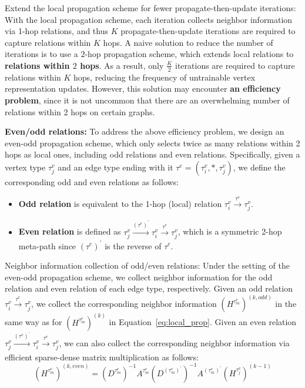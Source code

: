 \documentclass[lettersize,journal]{IEEEtran}
\begin{document}
Extend the local propagation scheme for fewer propagate-then-update iterations:
With the local propagation scheme, each iteration collects neighbor information via 1-hop relations, and thus $K$ propagate-then-update iterations are required to capture relations within $K$ hops.
A naive solution to reduce the number of iterations is to use a $2$-hop propagation scheme, which extends local relations to \textbf{relations within $2$ hops}.
As a result, only $\frac{K}{2}$ iterations are required to capture relations within $K$ hops, reducing the frequency of untrainable vertex representation updates.
However, this solution may encounter \textbf{an efficiency problem}, since it is not uncommon that there are an overwhelming number of relations within 2 hops on certain graphs.




\textbf{Even/odd relations:}
To address the above efficiency problem, we design an even-odd propagation scheme, which only selects twice as many relations within 2 hops as local ones, including odd relations and even relations.
Specifically, given a vertex type  $\tau^{v}_j$ and an edge type ending with it $\tau^{e} = (\tau^{v}_i, *, \tau^{v}_j)$, we define the corresponding odd and even relations as follows:
\begin{itemize}
\item \textbf{Odd relation} is equivalent to the 1-hop (local) relation $\tau^{v}_{i} \xrightarrow[]{\tau^{e}} \tau^{v}_{j}$.
\item \textbf{Even relation} is defined as $\tau^{v}_{j} \xrightarrow[]{(\tau^{e})^{\prime}} \tau^{v}_{i} \xrightarrow[]{\tau^{e}} \tau^{v}_{j}$, which is a symmetric 2-hop meta-path since $(\tau^{e})^{\prime}$ is the reverse of $\tau^{e}$.
\end{itemize}










Neighbor information collection of odd/even relations:
Under the setting of the even-odd propagation scheme, we collect neighbor information for the odd relation and even relation of each edge type, respectively.
Given an odd relation $\tau^{v}_{i} \xrightarrow[]{\tau^{e}} \tau^{v}_{j}$, we collect the corresponding neighbor information $(H^{\tau^{e}_{m}})^{(k, odd)}$ in the same way as for $(H^{\tau^{e}_{m}})^{(k)}$ in Equation~\ref{eq:local_prop}.
Given an even relation $\tau^{v}_{j} \xrightarrow[]{(\tau^{e})^{\prime}} \tau^{v}_{i} \xrightarrow[]{\tau^{e}} \tau^{v}_{j}$, we can also collect the corresponding neighbor information via efficient sparse-dense matrix multiplication as follows:
\begin{equation}
    (H^{\tau^{e}_{m}})^{(k, even)} = (D^{\tau^{e}_{m}})^{-1}A^{\tau^{e}_{m}} (D^{(\tau^{e}_{m})^{\prime}})^{-1}A^{(\tau^{e}_{m})^{\prime}} 
 (H^{\tau^{v}_{j}})^{(k-1)}
\end{equation}
\end{document}
